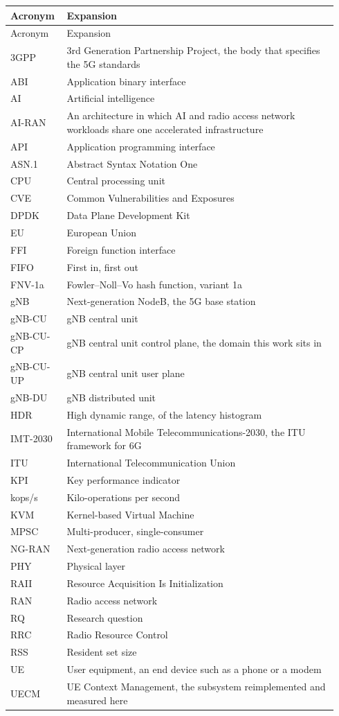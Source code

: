 \documentclass[english,oneside,a4paper,censored,csm,software-track-2020]{HYthesisML}
\begin{document}
\begingroup
\singlespacing
\footnotesize
\renewcommand{\arraystretch}{1.15}
\begin{longtable}{@{}p{0.15\linewidth} p{0.79\linewidth}@{}}
\hline\hline
Acronym & Expansion \\
\hline
\endfirsthead
\hline\hline
Acronym & Expansion \\
\hline
\endhead
3GPP & 3rd Generation Partnership Project, the body that specifies the 5G standards \\
ABI & Application binary interface \\
AI & Artificial intelligence \\
AI-RAN & An architecture in which AI and radio access network workloads share one accelerated infrastructure \\
API & Application programming interface \\
ASN.1 & Abstract Syntax Notation One \\
CPU & Central processing unit \\
CVE & Common Vulnerabilities and Exposures \\
DPDK & Data Plane Development Kit \\
EU & European Union \\
FFI & Foreign function interface \\
FIFO & First in, first out \\
FNV-1a & Fowler--Noll--Vo hash function, variant 1a \\
gNB & Next-generation NodeB, the 5G base station \\
gNB-CU & gNB central unit \\
gNB-CU-CP & gNB central unit control plane, the domain this work sits in \\
gNB-CU-UP & gNB central unit user plane \\
gNB-DU & gNB distributed unit \\
HDR & High dynamic range, of the latency histogram \\
IMT-2030 & International Mobile Telecommunications-2030, the ITU framework for 6G \\
ITU & International Telecommunication Union \\
KPI & Key performance indicator \\
kops/s & Kilo-operations per second \\
KVM & Kernel-based Virtual Machine \\
MPSC & Multi-producer, single-consumer \\
NG-RAN & Next-generation radio access network \\
PHY & Physical layer \\
RAII & Resource Acquisition Is Initialization \\
RAN & Radio access network \\
RQ & Research question \\
RRC & Radio Resource Control \\
RSS & Resident set size \\
UE & User equipment, an end device such as a phone or a modem \\
UECM & UE Context Management, the subsystem reimplemented and measured here \\
\hline
\end{longtable}
\end{document}
